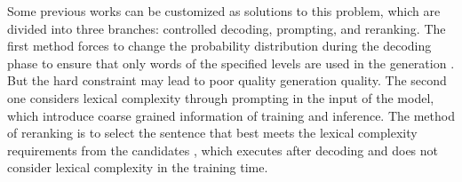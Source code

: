 \documentclass[11pt]{article}
\begin{document}
Some previous works can be customized as solutions to this problem, which are divided into three branches: controlled decoding, prompting, and reranking. The first method forces to change the probability distribution during the decoding phase to ensure that only words of the specified levels are used in the generation \cite{dathathri2019plug, DBA}. But the hard constraint may lead to poor quality generation quality. The second one considers lexical complexity through prompting \cite{brown2020language, raffel2020exploring, liang2021prefix} in the input of the model, which introduce coarse grained information of training and inference. The method of reranking is to select the sentence that best meets the lexical complexity requirements from the candidates \cite{ravaut2022summareranker, pandramish2020checkpoint}, which executes after decoding and does not consider lexical complexity in the training time.



\end{document}
